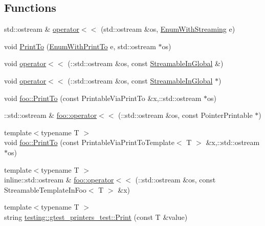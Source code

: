 \subsection*{Functions}
\begin{DoxyCompactItemize}
\item 
std\+::ostream \& \hyperlink{gtest-printers__test_8cc_ab3395b6b04bac565a0bd2fb36fbbb339}{operator$<$$<$} (std\+::ostream \&os, \hyperlink{gtest-printers__test_8cc_a52d9f846ca7a081ba3acf88dd6cd46dc}{Enum\+With\+Streaming} e)
\item 
void \hyperlink{gtest-printers__test_8cc_aad8245a4b48cd65607b86153d0f9dbe6}{Print\+To} (\hyperlink{gtest-printers__test_8cc_a904d619d593201ed509be794aed041ec}{Enum\+With\+Print\+To} e, std\+::ostream $\ast$os)
\item 
void \hyperlink{gtest-printers__test_8cc_a7b9d893679e433b9a70f15a9c9d6446c}{operator$<$$<$} (\+::std\+::ostream \&os, const \hyperlink{class_streamable_in_global}{Streamable\+In\+Global} \&)
\item 
void \hyperlink{gtest-printers__test_8cc_a0794c66a458fe922bfb717080d047311}{operator$<$$<$} (\+::std\+::ostream \&os, const \hyperlink{class_streamable_in_global}{Streamable\+In\+Global} $\ast$)
\item 
void \hyperlink{namespacefoo_a6808585dc0cb2884adeb4f39e3cb95cf}{foo\+::\+Print\+To} (const Printable\+Via\+Print\+To \&x,\+::std\+::ostream $\ast$os)
\item 
\+::std\+::ostream \& \hyperlink{namespacefoo_a65f8809f6af7f69f5cc842493caf4491}{foo\+::operator$<$$<$} (\+::std\+::ostream \&os, const Pointer\+Printable $\ast$)
\item 
{\footnotesize template$<$typename T $>$ }\\void \hyperlink{namespacefoo_a27945da9cb5c9d3d51b69e6429c2f46d}{foo\+::\+Print\+To} (const Printable\+Via\+Print\+To\+Template$<$ T $>$ \&x,\+::std\+::ostream $\ast$os)
\item 
{\footnotesize template$<$typename T $>$ }\\inline\+::std\+::ostream \& \hyperlink{namespacefoo_abe04f604d114085b0b9af25600ef00da}{foo\+::operator$<$$<$} (\+::std\+::ostream \&os, const Streamable\+Template\+In\+Foo$<$ T $>$ \&x)
\item 
{\footnotesize template$<$typename T $>$ }\\string \hyperlink{namespacetesting_1_1gtest__printers__test_adab26e59d2d7781c06a2c1c5948a8f65}{testing\+::gtest\+\_\+printers\+\_\+test\+::\+Print} (const T \&value)
\item 

\end{DoxyCompactItemize}
